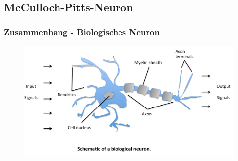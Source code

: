 \subsection{McCulloch-Pitts-Neuron }

\begin{frame}
\frametitle{Zusammenhang - Biologisches Neuron}

\begin{figure}
\includegraphics[width=\linewidth]{./geschichtliches/mcCullochPittsNeuron/img/bioNeuron_alpha}
\end{figure}

\end{frame}


